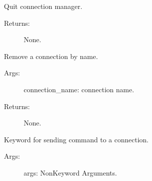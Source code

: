 \documentclass[letterpaper,10pt,english]{sphinxmanual}
\begin{document}
\begin{fulllineitems}
\begin{fulllineitems}
\end{fulllineitems}


\begin{fulllineitems}
\label{\detokenize{QConnectionLibrary:QConnectionLibrary.connection_manager.ConnectionManager.quit}}
\sphinxAtStartPar
Quit connection manager.
\begin{description}
\item[{Returns:}] \leavevmode
\sphinxAtStartPar
None.

\end{description}

\end{fulllineitems}


\begin{fulllineitems}
\label{\detokenize{QConnectionLibrary:QConnectionLibrary.connection_manager.ConnectionManager.remove_connection}}
\sphinxAtStartPar
Remove a connection by name.
\begin{description}
\item[{Args:}] \leavevmode
\sphinxAtStartPar
connection\_name: connection name.

\item[{Returns:}] \leavevmode
\sphinxAtStartPar
None.

\end{description}

\end{fulllineitems}


\begin{fulllineitems}
\label{\detokenize{QConnectionLibrary:QConnectionLibrary.connection_manager.ConnectionManager.send_command}}
\sphinxAtStartPar
Keyword for sending command to a connection.
\begin{description}
\item[{Args:}] \leavevmode
\sphinxAtStartPar
args:   Non\sphinxhyphen{}Keyword Arguments.


\end{description}
\end{fulllineitems}
\end{fulllineitems}
\end{document}
